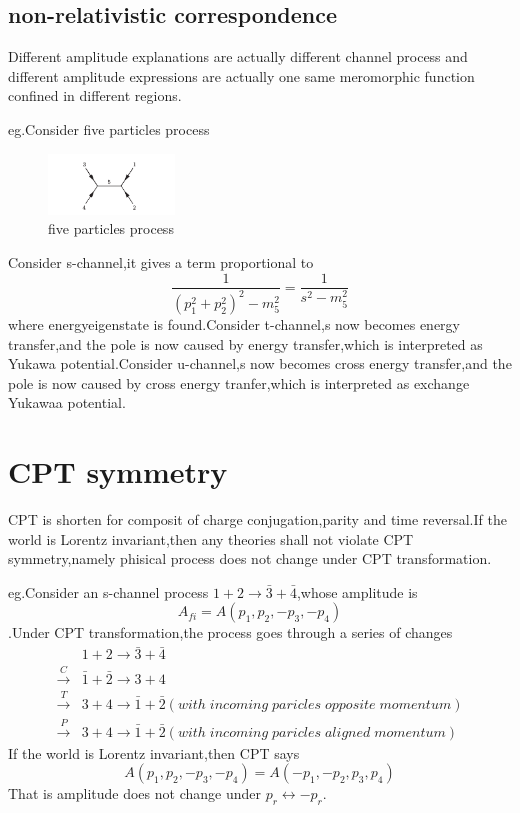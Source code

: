 \documentclass[a4paper]{article}
\begin{document}
\subsection{non-relativistic correspondence}
Different amplitude explanations are actually different channel process and different amplitude expressions are actually one same meromorphic function confined in different regions.
\par eg.Consider five particles process
\begin{figure}[htbp]
	\centering
	\includegraphics[width=0.3\textwidth,height=0.05\textheight]{16.png}
	\caption{five particles process}
\end{figure}

Consider s-channel,it gives a term proportional to$$\frac{1}{(p_1^2+p_2^2)^2-m_5^2}=\frac{1}{s^2-m^2_5}$$where energyeigenstate is found.Consider t-channel,s now becomes energy transfer,and the pole is now caused by energy transfer,which is interpreted as Yukawa potential.Consider u-channel,s now becomes cross energy transfer,and the pole is now caused by cross energy tranfer,which is interpreted as exchange Yukawaa potential.

\section{CPT symmetry}
CPT is shorten for composit of charge conjugation,parity and time reversal.If the world is Lorentz invariant,then any theories shall not violate CPT symmetry,namely phisical process does not change under CPT transformation.
\par eg.Consider an s-channel process $1+2\rightarrow\bar{3}+\bar{4}$,whose amplitude is $$A_{fi}=A(p_1,p_2,-p_3,-p_4)$$.Under CPT transformation,the process goes through a series of changes
\begin{align*}
	&1+2\rightarrow\bar{3}+\bar{4}\\
	\overset{C}{\rightarrow}&\bar{1}+\bar{2}\rightarrow3+4\\
	\overset{T}{\rightarrow}&3+4\rightarrow\bar{1}+\bar{2}(with\;incoming\;paricles\;opposite\;momentum)\\
	\overset{P}{\rightarrow}&3+4\rightarrow\bar{1}+\bar{2}(with\;incoming\;paricles\;aligned\;momentum)
\end{align*}
If the world is Lorentz invariant,then CPT says$$A(p_1,p_2,-p_3,-p_4)=A(-p_1,-p_2,p_3,p_4)$$That is amplitude does not change under $p_r\leftrightarrow-p_r$.
\end{document}
